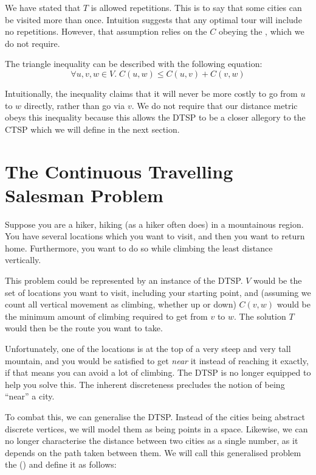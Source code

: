 We have stated that $T$ is allowed repetitions. This is to say that some cities can be visited more than once. Intuition suggests that any optimal tour will include no repetitions. However, that assumption relies on the  $C$ obeying the , which we do not require.

The triangle inequality can be described with the following equation:
\begin{equation*}
  \forall u,v,w\in V.\; C(u,w) \leq C(u,v) + C(v,w)
\end{equation*} 

Intuitionally, the inequality claims that it will never be more costly to go from $u$ to $w$ directly, rather than go via $v$. We do not require that our distance metric obeys this inequality because this allows the DTSP to be a closer allegory to the CTSP which we will define in the next section.

\todo[Illustration]

\section{The Continuous Travelling Salesman Problem}

Suppose you are a hiker, hiking (as a hiker often does) in a mountainous region. You have several locations which you want to visit, and then you want to return home. Furthermore, you want to do so while climbing the least distance vertically.


This problem could be represented by an instance of the DTSP. $V$ would be the set of locations you want to visit, including your starting point, and (assuming we count all vertical movement as climbing, whether up or down) $C(v,w)$ would be the minimum amount of climbing required to get from $v$ to $w$. The solution $T$ would then be the route you want to take.

Unfortunately, one of the locations is at the top of a very steep and very tall mountain, and you would be satisfied to get \textit{near} it instead of reaching it exactly, if that means you can avoid a lot of climbing. The DTSP is no longer equipped to help you solve this. The inherent discreteness precludes the notion of being ``near'' a city.

To combat this, we can generalise the DTSP. Instead of the cities being abstract discrete vertices, we will model them as being points in a  space. Likewise, we can no longer characterise the distance between two cities as a single number, as it depends on the path taken between them. We will call this generalised problem the  () and define it as follows:

